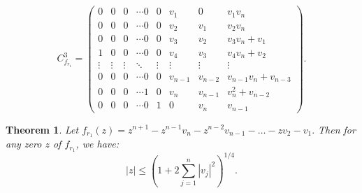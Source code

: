 \documentclass [12pt]{article}
\newtheorem{theorem}{Theorem}
\begin{document}
\[
C^{3}_{f_{r_{1}}} = 
\begin{pmatrix}
0 & 0 & 0 & \cdots 0&0& v_{1}&0 &v_{1}v_{n}\\
0 & 0 & 0 & \cdots0 & 0 & v_{2}&v_{1} &v_{2}v_{n}\\
0 & 0 & 0 & \cdots0 & 0 & v_{3}&v_{2} &v_{3}v_{n}+v_{1}\\
1 & 0 & 0 & \cdots0 & 0 & v_{4}&v_{3} &v_{4}v_{n}+v_{2}\\
\vdots & \vdots & \vdots &\ddots & \vdots & \vdots & \vdots & \vdots  \\
0 & 0 & 0 & \cdots0 & 0 & v_{n-1}&v_{n-2} &v_{n-1}v_{n}+v_{n-3}\\
0 & 0 & 0 & \cdots 1 & 0 & v_{n}&v_{n-1} &v^{2}_{n}+v_{n-2}\\
0 & 0 & 0 & \cdots 0 & 1 & 0 & v_{n} &v_{n-1}
\end{pmatrix}.
\] 



 


































\begin{theorem}
Let $f_{r_{1}}(z)= z^{n+1}-z^{n-1}v_{n}-z^{n-2}v_{n-1}-\dots- zv_{2}-v_{1}.$ Then for any zero $z$ of $f_{r_{1}}$, we have:
\[
|z| \leq \left(1 + 2 \sum_{j=1}^{n} |v_j|^2 \right)^{1/4}.\]
\end{theorem}
\end{document}
